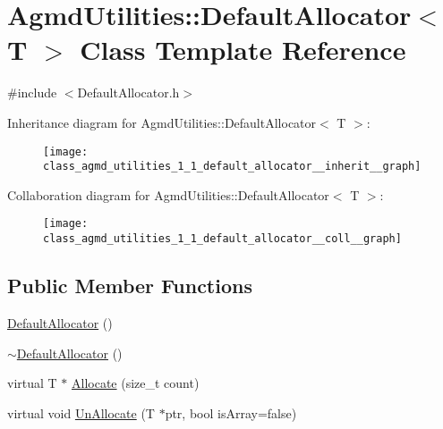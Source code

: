 \hypertarget{class_agmd_utilities_1_1_default_allocator}{\section{Agmd\+Utilities\+:\+:Default\+Allocator$<$ T $>$ Class Template Reference}
\label{class_agmd_utilities_1_1_default_allocator}
}


{\ttfamily \#include $<$Default\+Allocator.\+h$>$}



Inheritance diagram for Agmd\+Utilities\+:\+:Default\+Allocator$<$ T $>$\+:\nopagebreak
\begin{figure}[H]
\begin{center}
\leavevmode
\texttt{[image: class\_agmd\_utilities\_1\_1\_default\_allocator\_\_inherit\_\_graph]}
\end{center}
\end{figure}


Collaboration diagram for Agmd\+Utilities\+:\+:Default\+Allocator$<$ T $>$\+:\nopagebreak
\begin{figure}[H]
\begin{center}
\leavevmode
\texttt{[image: class\_agmd\_utilities\_1\_1\_default\_allocator\_\_coll\_\_graph]}
\end{center}
\end{figure}
\subsection*{Public Member Functions}
\begin{DoxyCompactItemize}
\item 
\hyperlink{class_agmd_utilities_1_1_default_allocator_aa1bac5eff38353e8d2bd9237943200d6}{Default\+Allocator} ()
\item 
\hyperlink{class_agmd_utilities_1_1_default_allocator_a3d2e3a34ddb5633cf2f1530b4f4b8ca5}{$\sim$\+Default\+Allocator} ()
\item 
virtual T $\ast$ \hyperlink{class_agmd_utilities_1_1_default_allocator_a041371f1bdf5beb3c035548d1cb0b6b6}{Allocate} (size\+\_\+t count)
\item 
virtual void \hyperlink{class_agmd_utilities_1_1_default_allocator_a213530de9646c3b49e85a6b469ba5e78}{Un\+Allocate} (T $\ast$ptr, bool is\+Array=false)
\end{DoxyCompactItemize}


